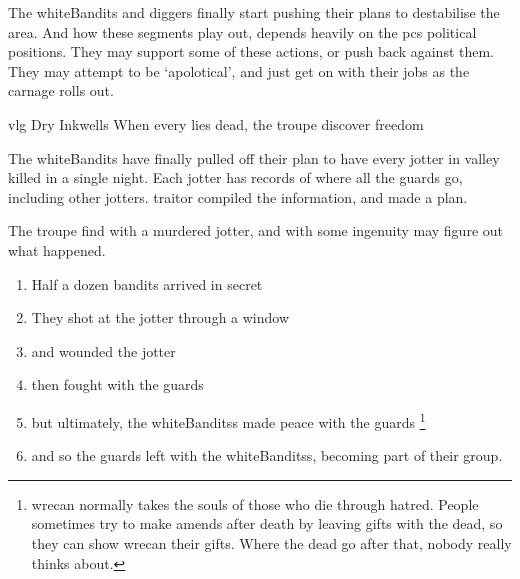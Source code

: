 \label{risingTitles}

\noindent
The \gls{whiteBandits} and \glspl{digger} finally start pushing their plans to destabilise the area.
And how these \glspl{segment} play out, depends heavily on the \glspl{pc} political positions.
They may support some of these actions, or push back against them.
They may attempt to be `apolotical', and just get on with their jobs as the carnage rolls out.

{\gls{vlg} Dry Inkwells}%
{When every  lies dead, the troupe discover freedom}%

\begin{exampletext}
  The \gls{whiteBandits} have finally pulled off their plan to have every \gls{jotter} in \gls{valley} killed in a single night.
  Each \gls{jotter} has records of where all the \glspl{guard} go, including other \glspl{jotter}.
  \Gls{traitor} compiled the information, and made a plan.
\end{exampletext}

The troupe find  with a murdered \gls{jotter}, and with some ingenuity may figure out what happened.

\begin{enumerate}
  \item
  Half a dozen bandits arrived in secret
  \item
  They shot at the \gls{jotter} through a window
  \item
  and wounded the \gls{jotter}
  \item
  then fought with the \glspl{guard}
  \item
  but ultimately, the \glspl{whiteBandits} made peace with the \glspl{guard}
  \footnote{\Gls{wrecan} normally takes the souls of those who die through hatred.  People sometimes try to make amends after death by leaving gifts with the dead, so they can show \gls{wrecan} their gifts.  Where the dead go after that, nobody really thinks about.}
  \item
  and so the \glspl{guard} left with the \glspl{whiteBandits}, becoming part of their group.
\end{enumerate}

